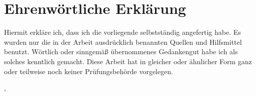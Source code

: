
\section*{Ehrenwörtliche Erklärung}
\label{sec:ehrenwoertliche-erklaerung}

Hiermit erkläre ich, dass ich die vorliegende \dokumententyp{} selbstständig angefertig habe.
Es wurden nur die in der Arbeit ausdrücklich benannten Quellen und Hilfsmittel benutzt.
Wörtlich oder sinngemäß übernommenes Gedankengut habe ich als solches kenntlich gemacht.
Diese Arbeit hat in gleicher oder ähnlicher Form ganz oder teilweise noch keiner Prüfungsbehörde vorgelegen.
\vspace{20mm}

\ort, \abgabedatum
\vspace{10mm}

\underline{\hspace{8cm}}\\\dokumentenautor